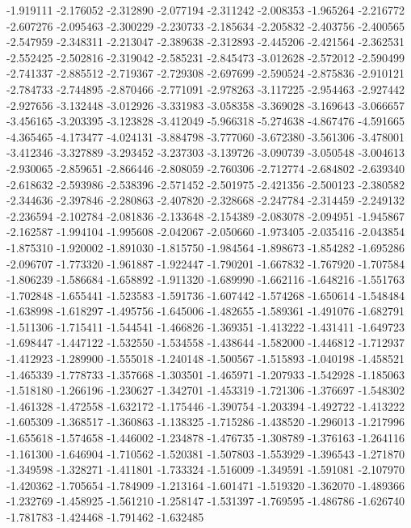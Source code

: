 -1.919111
-2.176052
-2.312890
-2.077194
-2.311242
-2.008353
-1.965264
-2.216772
-2.607276
-2.095463
-2.300229
-2.230733
-2.185634
-2.205832
-2.403756
-2.400565
-2.547959
-2.348311
-2.213047
-2.389638
-2.312893
-2.445206
-2.421564
-2.362531
-2.552425
-2.502816
-2.319042
-2.585231
-2.845473
-3.012628
-2.572012
-2.590499
-2.741337
-2.885512
-2.719367
-2.729308
-2.697699
-2.590524
-2.875836
-2.910121
-2.784733
-2.744895
-2.870466
-2.771091
-2.978263
-3.117225
-2.954463
-2.927442
-2.927656
-3.132448
-3.012926
-3.331983
-3.058358
-3.369028
-3.169643
-3.066657
-3.456165
-3.203395
-3.123828
-3.412049
-5.966318
-5.274638
-4.867476
-4.591665
-4.365465
-4.173477
-4.024131
-3.884798
-3.777060
-3.672380
-3.561306
-3.478001
-3.412346
-3.327889
-3.293452
-3.237303
-3.139726
-3.090739
-3.050548
-3.004613
-2.930065
-2.859651
-2.866446
-2.808059
-2.760306
-2.712774
-2.684802
-2.639340
-2.618632
-2.593986
-2.538396
-2.571452
-2.501975
-2.421356
-2.500123
-2.380582
-2.344636
-2.397846
-2.280863
-2.407820
-2.328668
-2.247784
-2.314459
-2.249132
-2.236594
-2.102784
-2.081836
-2.133648
-2.154389
-2.083078
-2.094951
-1.945867
-2.162587
-1.994104
-1.995608
-2.042067
-2.050660
-1.973405
-2.035416
-2.043854
-1.875310
-1.920002
-1.891030
-1.815750
-1.984564
-1.898673
-1.854282
-1.695286
-2.096707
-1.773320
-1.961887
-1.922447
-1.790201
-1.667832
-1.767920
-1.707584
-1.806239
-1.586684
-1.658892
-1.911320
-1.689990
-1.662116
-1.648216
-1.551763
-1.702848
-1.655441
-1.523583
-1.591736
-1.607442
-1.574268
-1.650614
-1.548484
-1.638998
-1.618297
-1.495756
-1.645006
-1.482655
-1.589361
-1.491076
-1.682791
-1.511306
-1.715411
-1.544541
-1.466826
-1.369351
-1.413222
-1.431411
-1.649723
-1.698447
-1.447122
-1.532550
-1.534558
-1.438644
-1.582000
-1.446812
-1.712937
-1.412923
-1.289900
-1.555018
-1.240148
-1.500567
-1.515893
-1.040198
-1.458521
-1.465339
-1.778733
-1.357668
-1.303501
-1.465971
-1.207933
-1.542928
-1.185063
-1.518180
-1.266196
-1.230627
-1.342701
-1.453319
-1.721306
-1.376697
-1.548302
-1.461328
-1.472558
-1.632172
-1.175446
-1.390754
-1.203394
-1.492722
-1.413222
-1.605309
-1.368517
-1.360863
-1.138325
-1.715286
-1.438520
-1.296013
-1.217996
-1.655618
-1.574658
-1.446002
-1.234878
-1.476735
-1.308789
-1.376163
-1.264116
-1.161300
-1.646904
-1.710562
-1.520381
-1.507803
-1.553929
-1.396543
-1.271870
-1.349598
-1.328271
-1.411801
-1.733324
-1.516009
-1.349591
-1.591081
-2.107970
-1.420362
-1.705654
-1.784909
-1.213164
-1.601471
-1.519320
-1.362070
-1.489366
-1.232769
-1.458925
-1.561210
-1.258147
-1.531397
-1.769595
-1.486786
-1.626740
-1.781783
-1.424468
-1.791462
-1.632485
